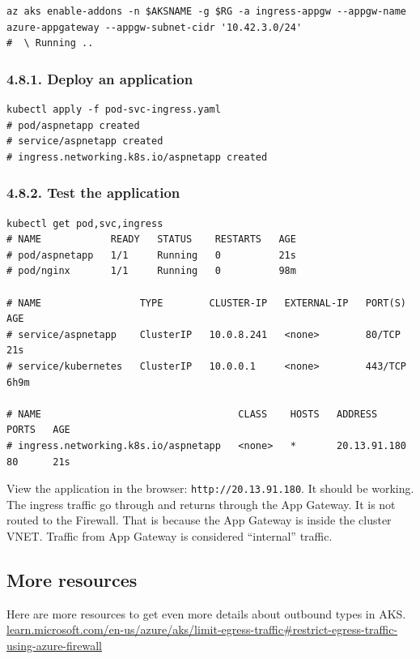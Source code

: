 \documentclass[
]{article}
\newcommand{\passthrough}[1]{#1}
\begin{document}
\begin{lstlisting}
az aks enable-addons -n $AKSNAME -g $RG -a ingress-appgw --appgw-name azure-appgateway --appgw-subnet-cidr '10.42.3.0/24'
#  \ Running ..
\end{lstlisting}

\hypertarget{deploy-an-application}{%
\subsubsection{4.8.1. Deploy an
application}\label{deploy-an-application}}

\begin{lstlisting}
kubectl apply -f pod-svc-ingress.yaml
# pod/aspnetapp created
# service/aspnetapp created
# ingress.networking.k8s.io/aspnetapp created
\end{lstlisting}

\hypertarget{test-the-application}{%
\subsubsection{4.8.2. Test the application}\label{test-the-application}}

\begin{lstlisting}
kubectl get pod,svc,ingress
# NAME            READY   STATUS    RESTARTS   AGE
# pod/aspnetapp   1/1     Running   0          21s
# pod/nginx       1/1     Running   0          98m

# NAME                 TYPE        CLUSTER-IP   EXTERNAL-IP   PORT(S)   AGE
# service/aspnetapp    ClusterIP   10.0.8.241   <none>        80/TCP    21s
# service/kubernetes   ClusterIP   10.0.0.1     <none>        443/TCP   6h9m

# NAME                                  CLASS    HOSTS   ADDRESS        PORTS   AGE
# ingress.networking.k8s.io/aspnetapp   <none>   *       20.13.91.180   80      21s
\end{lstlisting}

View the application in the browser:
\passthrough{\lstinline!http://20.13.91.180!}. It should be working. The
ingress traffic go through and returns through the App Gateway. It is
not routed to the Firewall. That is because the App Gateway is inside
the cluster VNET. Traffic from App Gateway is considered ``internal''
traffic.

\hypertarget{more-resources}{%
\subsection{More resources}\label{more-resources}}

Here are more resources to get even more details about outbound types in
AKS.
\href{https://learn.microsoft.com/en-us/azure/aks/limit-egress-traffic\#restrict-egress-traffic-using-azure-firewall}{learn.microsoft.com/en-us/azure/aks/limit-egress-traffic\#restrict-egress-traffic-using-azure-firewall}
\end{document}
